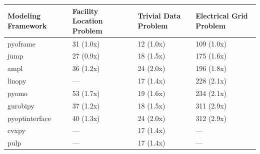 \begin{tabular*}{\linewidth}{@{\extracolsep{\fill}}llll}
\toprule
Modeling Framework & Facility Location Problem & Trivial Data Problem & Electrical Grid Problem \\ 
\midrule\addlinespace[2.5pt]
pyoframe & \cellcolor[HTML]{ffffff} 31 (1.0x) & \cellcolor[HTML]{ffffff} 12 (1.0x) & \cellcolor[HTML]{ffffff} 109 (1.0x) \\
jump & \cellcolor[HTML]{f3faf4} 27 (0.9x) & \cellcolor[HTML]{f9d9d9} 18 (1.5x) & \cellcolor[HTML]{f8d3d3} 175 (1.6x) \\
ampl & \cellcolor[HTML]{fdf1f1} 36 (1.2x) & \cellcolor[HTML]{f5bfbf} 24 (2.0x) & \cellcolor[HTML]{f6c9c9} 196 (1.8x) \\
linopy & — & \cellcolor[HTML]{fadfdf} 17 (1.4x) & \cellcolor[HTML]{f4bbbb} 228 (2.1x) \\
pyomo & \cellcolor[HTML]{f7cdcd} 53 (1.7x) & \cellcolor[HTML]{f8d5d5} 19 (1.6x) & \cellcolor[HTML]{f4b8b8} 234 (2.1x) \\
gurobipy & \cellcolor[HTML]{fcefef} 37 (1.2x) & \cellcolor[HTML]{f9d9d9} 18 (1.5x) & \cellcolor[HTML]{f09e9e} 311 (2.9x) \\
pyoptinterface & \cellcolor[HTML]{fbe8e8} 40 (1.3x) & \cellcolor[HTML]{f5bfbf} 24 (2.0x) & \cellcolor[HTML]{f09e9e} 312 (2.9x) \\
cvxpy & — & \cellcolor[HTML]{fadfdf} 17 (1.4x) & — \\
pulp & — & \cellcolor[HTML]{fadfdf} 17 (1.4x) & — \\
\bottomrule
\end{tabular*}